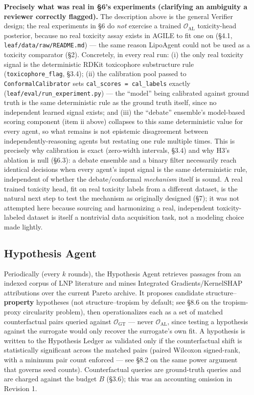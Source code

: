 \documentclass{article}
\begin{document}
\textbf{Precisely what was real in \S6's experiments (clarifying an
ambiguity a reviewer correctly flagged).} The description above is the
general Verifier design; the real experiments in \S6 do \emph{not}
exercise a trained $\mathcal{O}_{\text{AL}}$ toxicity-head posterior,
because no real toxicity assay exists in AGILE to fit one on (\S4.1,
\texttt{leaf/data/raw/README.md}) --- the same reason LipoAgent could not
be used as a toxicity comparator (\S2). Concretely, in every real run:
(i) the only real toxicity signal is the deterministic RDKit toxicophore
substructure rule (\texttt{toxicophore\_flag}, \S3.4); (ii) the
calibration pool passed to \texttt{ConformalCalibrator} sets
\texttt{cal\_scores = cal\_labels} exactly (\texttt{leaf/eval/run\_experiment.py}) ---
the ``model'' being calibrated against ground truth is the same
deterministic rule as the ground truth itself, since no independent
learned signal exists; and (iii) the ``debate'' ensemble's model-based
scoring component (item ii above) collapses to this same deterministic
value for every agent, so what remains is not epistemic disagreement
between independently-reasoning agents but restating one rule multiple
times. This is precisely why calibration is exact (zero-width intervals,
\S3.4) and why H3's ablation is null (\S6.3): a debate ensemble and a
binary filter necessarily reach identical decisions when every agent's
input signal is the same deterministic rule, independent of whether the
debate/conformal \emph{mechanism} itself is sound. A real trained
toxicity head, fit on real toxicity labels from a different dataset, is
the natural next step to test the mechanism as originally designed
(\S7); it was not attempted here because sourcing and harmonizing a real,
independent toxicity-labeled dataset is itself a nontrivial data
acquisition task, not a modeling choice made lightly.

\subsection{Hypothesis Agent}

Periodically (every $k$ rounds), the Hypothesis Agent retrieves passages
from an indexed corpus of LNP literature and mines Integrated
Gradients/KernelSHAP attributions over the current Pareto archive. It
proposes candidate structure--\textbf{property} hypotheses (not
structure--tropism by default; see \S8.6 on the tropism-proxy circularity
problem), then operationalizes each as a set of matched counterfactual
pairs queried against $\mathcal{O}_{\text{GT}}$ --- never
$\mathcal{O}_{\text{AL}}$, since testing a hypothesis against the surrogate
would only recover the surrogate's own fit. A hypothesis is written to the
Hypothesis Ledger as validated only if the counterfactual shift is
statistically significant across the matched pairs (paired Wilcoxon
signed-rank, with a minimum pair count enforced --- see \S8.2 on the same
power argument that governs seed counts). Counterfactual queries are
ground-truth queries and are charged against the budget $B$ (\S3.6); this
was an accounting omission in Revision 1.
\end{document}
